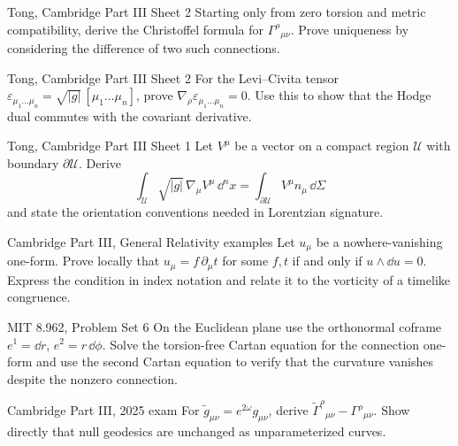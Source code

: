 \begin{exercise}{Tong, Cambridge Part III Sheet 2}
Starting only from zero torsion and metric compatibility, derive the
Christoffel formula for \(\Gamma^\rho{}_{\mu\nu}\).  Prove uniqueness by
considering the difference of two such connections.
\end{exercise}

\begin{exercise}{Tong, Cambridge Part III Sheet 2}
For the Levi--Civita tensor
\(\varepsilon_{\mu_1\ldots\mu_n}=\sqrt{|g|}\,[\mu_1\ldots\mu_n]\), prove
\(\nabla_\rho\varepsilon_{\mu_1\ldots\mu_n}=0\).  Use this to show that the
Hodge dual commutes with the covariant derivative.
\end{exercise}

\begin{exercise}{Tong, Cambridge Part III Sheet 1}
Let \(V^\mu\) be a vector on a compact region \(\mathcal U\) with boundary
\(\partial\mathcal U\).  Derive
\[
\int_{\mathcal U}\sqrt{|g|}\,\nabla_\mu V^\mu\,\dd^nx
=\int_{\partial\mathcal U}V^\mu n_\mu\,\dd\Sigma
\]
and state the orientation conventions needed in Lorentzian signature.
\end{exercise}

\begin{exercise}{Cambridge Part III, General Relativity examples}
Let \(u_\mu\) be a nowhere-vanishing one-form.  Prove locally that
\(u_\mu=f\,\partial_\mu t\) for some \(f,t\) if and only if
\(u\wedge\dd u=0\).  Express the condition in index notation and relate it to
the vorticity of a timelike congruence.
\end{exercise}

\begin{exercise}{MIT 8.962, Problem Set 6}
On the Euclidean plane use the orthonormal coframe
\(e^1=\dd r\), \(e^2=r\,\dd\phi\).  Solve the torsion-free Cartan equation for
the connection one-form and use the second Cartan equation to verify that the
curvature vanishes despite the nonzero connection.
\end{exercise}

\begin{exercise}{Cambridge Part III, 2025 exam}
For \(\widetilde g_{\mu\nu}=e^{2\omega}g_{\mu\nu}\), derive
\(\widetilde\Gamma^\rho{}_{\mu\nu}-\Gamma^\rho{}_{\mu\nu}\).  Show directly
that null geodesics are unchanged as unparameterized curves.
\end{exercise}

